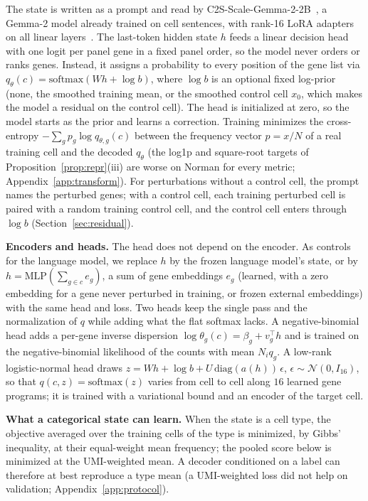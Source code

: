 \documentclass[10pt]{article}
\makeatletter
\newcommand{\backbone}{C2S-Scale-Gemma-2-2B}
\renewcommand\subsection{\@startsection{subsection}{2}{\z@}{-3.25ex\@plus -1ex \@minus -.2ex}{1.5ex \@plus .2ex}{\normalfont\large\bfseries\raggedright\hyphenpenalty=10000}}
\makeatother
\begin{document}
\subsection{A decision head on a condition encoder}\label{sec:decoder}
The state is written as a prompt and read by \backbone{}~\citep{c2sgemma_hf,gemma2team2024}, a Gemma-2 model already trained on cell sentences, with rank-16 LoRA adapters on all linear layers~\citep{hu2022lora}. The last-token hidden state $h$ feeds a linear decision head with one logit per panel gene in a fixed panel order, so the model never orders or ranks genes. Instead, it assigns a probability to every position of the gene list via $q_\theta(c)=\mathrm{softmax}(Wh+\log b)$, where $\log b$ is an optional fixed log-prior (none, the smoothed training mean, or the smoothed control cell $x_0$, which makes the model a residual on the control cell). The head is initialized at zero, so the model starts as the prior and learns a correction. Training minimizes the cross-entropy $-\sum_gp_g\log q_{\theta,g}(c)$ between the frequency vector $p=x/N$ of a real training cell and the decoded $q_\theta$ (the log1p and square-root targets of Proposition~\ref{prop:repr}(iii) are worse on Norman for every metric; Appendix~\ref{app:transform}). For perturbations without a control cell, the prompt names the perturbed genes; with a control cell, each training perturbed cell is paired with a random training control cell, and the control cell enters through $\log b$ (Section~\ref{sec:residual}).

\textbf{Encoders and heads.} The head does not depend on the encoder. As controls for the language model, we replace $h$ by the frozen language model's state, or by $h=\mathrm{MLP}(\sum_{g\in c}e_g)$, a sum of gene embeddings $e_g$ (learned, with a zero embedding for a gene never perturbed in training, or frozen external embeddings) with the same head and loss. Two heads keep the single pass and the normalization of $q$ while adding what the flat softmax lacks. A negative-binomial head adds a per-gene inverse dispersion $\log\theta_g(c)=\beta_g+v_g^\top h$ and is trained on the negative-binomial likelihood of the counts with mean $N_iq_g$. A low-rank logistic-normal head draws $z=Wh+\log b+U\,\mathrm{diag}(a(h))\,\epsilon$, $\epsilon\sim\mathcal N(0,I_{16})$, so that $q(c,z)=\mathrm{softmax}(z)$ varies from cell to cell along $16$ learned gene programs; it is trained with a variational bound and an encoder of the target cell.

\textbf{What a categorical state can learn.} When the state is a cell type, the objective averaged over the training cells of the type is minimized, by Gibbs' inequality, at their equal-weight mean frequency; the pooled score below is minimized at the UMI-weighted mean. A decoder conditioned on a label can therefore at best reproduce a type mean (a UMI-weighted loss did not help on validation; Appendix~\ref{app:protocol}).
\end{document}
